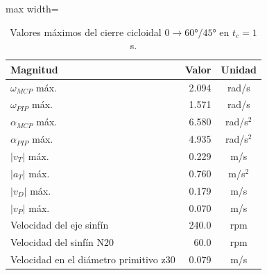 \begin{table}[H]
\centering

\begin{adjustbox}{max width=\textwidth}
\begin{tabular}{|l|r|c|}
\hline
\textbf{Magnitud} & \textbf{Valor} & \textbf{Unidad} \\ \hline
$\omega_{MCP}$ máx. & 2.094 & rad/s \\ \hline
$\omega_{PIP}$ máx. & 1.571 & rad/s \\ \hline
$\alpha_{MCP}$ máx. & 6.580 & rad/s$^2$ \\ \hline
$\alpha_{PIP}$ máx. & 4.935 & rad/s$^2$ \\ \hline
$|v_T|$ máx. & 0.229 & m/s \\ \hline
$|a_T|$ máx. & 0.760 & m/s$^2$ \\ \hline
$|v_D|$ máx. & 0.179 & m/s \\ \hline
$|v_P|$ máx. & 0.070 & m/s \\ \hline
Velocidad del eje sinfín & 240.0 & rpm \\ \hline
Velocidad del sinfín N20 & 60.0 & rpm \\ \hline
Velocidad en el diámetro primitivo z30 & 0.079 & m/s \\ \hline
\end{tabular}
\end{adjustbox}
\caption{Valores máximos del cierre cicloidal $0 \rightarrow 60°/45°$ en $t_c = 1$ s.}
\label{tab:cinem}
\end{table}